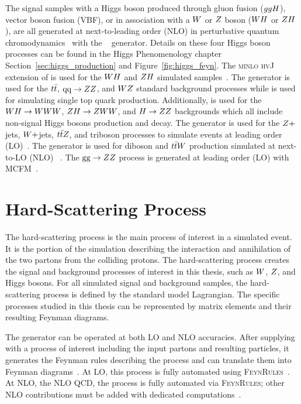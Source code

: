 The signal samples with a Higgs boson produced through gluon fusion ($ggH$), vector boson fusion (VBF),
or in association with a $W$ or $Z$ boson ($WH$ or $ZH$), are all
generated at next-to-leading order (NLO) in perturbative quantum chromodynamics~\cite{REYA1981195} 
with the ~\cite{Nason:2004rx,Frixione:2007vw, Alioli:2010xa, Alioli:2008tz} 
generator. Details on these four Higgs boson processes can be found in the Higgs Phenomenology chapter
Section~\ref{sec:higgs_production} and Figure~\ref{fig:higgs_feyn}. 
The \textsc{minlo hvJ} extension of  
is used for the $WH$ and $ZH$ simulated samples~\cite{Luisoni:2013kna}. 
The  generator is used for the $t\bar{t}$, $\text{q}\text{q} \to ZZ$, and $WZ$
standard background processes while  is used for simulating 
single top quark production.
Additionally, \POWHEG is used for the $WH \to WWW$, $ZH \to ZWW$,
and $H\to ZZ$ backgrounds which all include non-signal Higgs bosons production and decay.
The \MGAMCNLO generator is used for the $Z+$jets, $W+$jets, $t\bar{t} Z$, and triboson
processes to simulate events at leading order (LO)~\cite{Alwall:2007fs}.
The \MGAMCNLO generator is used for diboson and $t\bar{t} W$ production simulated at next-to-LO (NLO) 
~\cite{Frederix:2012ps}.
The $\text{g}\text{g} \to ZZ$ process is generated at leading order (LO) with 
\textsc{MCFM}~\cite{Campbell:2010ff}. 



\section{Hard-Scattering Process}
The hard-scattering process is the main process of interest in a simulated event.
It is the portion of the simulation describing the interaction and annihilation of the
two partons from the colliding protons. The hard-scattering process creates the 
signal and background processes of interest in this thesis,
such as $W$, $Z$, and Higgs bosons. For all simulated signal and background samples,
the hard-scattering process is defined by the standard model Lagrangian. The specific processes
studied in this thesis can be represented by matrix elements and their
resulting Feynman diagrams.

The \MGAMCNLO generator can be
operated at both LO and NLO accuracies. After supplying \MGAMCNLO with a process of interest including
the input partons and resulting particles, it generates the Feynman rules describing the 
process and can translate them into Feynman diagrams~\cite{Christensen:2008py}. 
At LO, this process is fully automated using \textsc{FeynRules}~\cite{Christensen:2008py,Alloul:2013bka}.
At NLO, the NLO QCD, the process is fully automated via \textsc{FeynRules}; other NLO contributions 
must be added with dedicated computations~\cite{Alwall:2014hca}.

